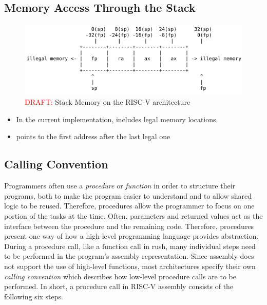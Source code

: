 
\subsection{Memory Access Through the Stack}

\begin{figure}[h]
	\includegraphics[width=\textwidth]{./riscv_stack_draft.png}
	\caption{\textcolor{red}{DRAFT:} Stack Memory on the RISC-V architecture}\label{fig:riscv_stack}
\end{figure}

\begin{itemize}
	\item In the current implementation,  includes legal memory locations
	\item {} points to the first address after the last legal one
\end{itemize}

\subsection{Calling Convention}

Programmers often use a \emph{procedure} or \emph{function} in order to structure their programs,
both to make the program easier to understand and to allow shared logic to be reused.
Therefore, procedures allow the programmer to focus on one portion of the tasks at the time.
Often, parameters and returned values act as the interface between the procedure and the remaining code.
Therefore, procedures present one way of how a high-level programming language provides abstraction.
During a procedure call, like a function call in rush, many individual steps need to be performed in the program's assembly representation.
Since assembly does not support the use of high-level functions, most architectures specify their own \emph{calling convention} which describes how low-level procedure calls are to be performed.
In short, a procedure call in RISC-V assembly consists of the following six steps.

